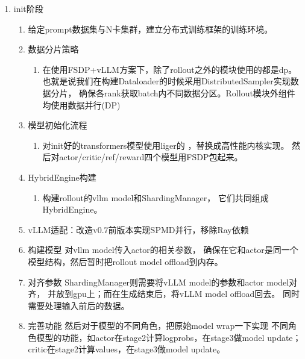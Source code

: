\documentclass[UTF8,fontset=fandol]{ctexart}
\begin{document}
\begin{enumerate}
  \item init阶段
  \begin{enumerate}
    \item 给定prompt数据集与N卡集群，建立分布式训练框架的训练环境。
    \item 数据分片策略
    \begin{enumerate}
      \item 在使用FSDP+vLLM方案下，除了rollout之外的模块使用的都是dp。
        也就是说我们在构建Dataloader的时候采用DistributedSampler实现数据分片，
        确保各rank获取batch内不同数据分区。Rollout模块外组件均使用数据并行(DP)
    \end{enumerate}
    \item 模型初始化流程
    \begin{enumerate}
      \item 对init好的transformers模型使用liger的
        ，替换成高性能内核实现。
        然后对actor/critic/ref/reward四个模型用FSDP包起来。
    \end{enumerate}
    \item HybridEngine构建
    \begin{enumerate}
      \item 构建rollout的vllm model和ShardingManager，
        它们共同组成HybridEngine。
    \end{enumerate}
    \item vLLM适配：改造v0.7前版本实现SPMD并行，移除Ray依赖
    \item 构建模型 对vllm model传入actor的相关参数，
      确保在它和actor是同一个模型结构，然后暂时把rollout model offload到内存。
    \item 对齐参数 ShardingManager则需要将vLLM model的参数和actor model对齐，
      并放到gpu上；而在生成结束后，将vLLM model offload回去。
      同时需要处理输入前后的数据。
    \item 完善功能 然后对于模型的不同角色，把原始model wrap一下实现
      不同角色模型的功能，如actor在stage2计算logprobs，在stage3做model update；
      critic在stage2计算values，在stage3做model update。
  \end{enumerate}


\end{enumerate}
\end{document}

